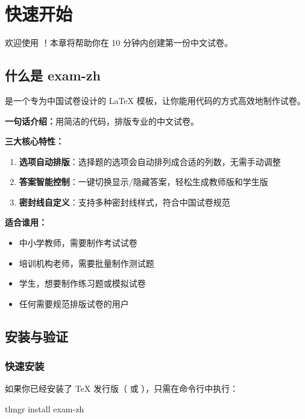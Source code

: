 
\section{快速开始}

欢迎使用 ！本章将帮助你在 10 分钟内创建第一份中文试卷。

\subsection{什么是 exam-zh}

 是一个专为中国试卷设计的 \LaTeX{} 模板，让你能用代码的方式高效地制作试卷。

\textbf{一句话介绍：}用简洁的代码，排版专业的中文试卷。

\textbf{三大核心特性：}

\begin{enumerate}
  \item \textbf{选项自动排版}：选择题的选项会自动排列成合适的列数，无需手动调整
  \item \textbf{答案智能控制}：一键切换显示/隐藏答案，轻松生成教师版和学生版
  \item \textbf{密封线自定义}：支持多种密封线样式，符合中国试卷规范
\end{enumerate}

\textbf{适合谁用：}

\begin{itemize}
  \item 中小学教师，需要制作考试试卷
  \item 培训机构老师，需要批量制作测试题
  \item 学生，想要制作练习题或模拟试卷
  \item 任何需要规范排版试卷的用户
\end{itemize}


\subsection{安装与验证}

\subsubsection{快速安装}

如果你已经安装了 \TeX{} 发行版（\TeXLive{} 或 \MiKTeX{}），只需在命令行中执行：

\begin{shellcode}[morekeywords={tlmgr,install}]
  tlmgr install exam-zh
\end{shellcode}

